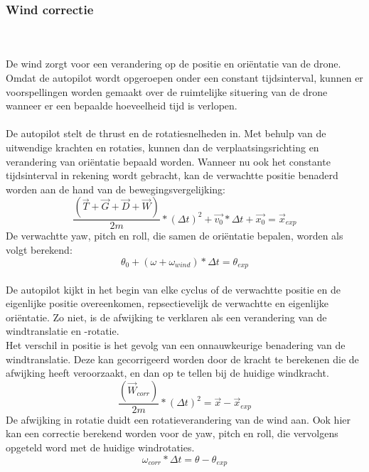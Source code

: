 \subsubsection{Wind correctie}
\\
\\
De wind zorgt voor een verandering op de positie en ori\"entatie van de drone. Omdat de autopilot wordt opgeroepen onder een constant tijdsinterval, kunnen er voorspellingen worden gemaakt over de ruimtelijke situering van de drone wanneer er een bepaalde hoeveelheid tijd is verlopen.
\\
\\
De autopilot stelt de thrust en de rotatiesnelheden in. Met behulp van de uitwendige krachten en rotaties, kunnen dan de verplaatsingsrichting en verandering van ori\"entatie bepaald worden. Wanneer nu ook het constante tijdsinterval in rekening wordt gebracht, kan de verwachtte positie benaderd worden aan de hand van de bewegingsvergelijking:
\begin{equation}
	 \frac{(\vec{T} + \vec{G} + \vec{D} + \vec{W}) }{2m} * (\Delta t)^2 + \vec{v_0} * \Delta t + \vec{x_0} = \vec{x}_{exp}
\end{equation}
De verwachtte yaw, pitch en roll, die samen de ori\"entatie bepalen, worden als volgt berekend:
\begin{equation}
	\theta_0 + (\omega + \omega_{wind})*\Delta t = \theta_{exp}
\end{equation}
\\
De autopilot kijkt in het begin van elke cyclus of de verwachtte positie en de eigenlijke positie overeenkomen, repsectievelijk de verwachtte en eigenlijke ori\"entatie. Zo niet, is de afwijking te verklaren als een verandering van de windtranslatie en -rotatie. 
\\
Het verschil in positie is het gevolg van een onnauwkeurige benadering van de windtranslatie. Deze kan gecorrigeerd worden door de kracht te berekenen die de afwijking heeft veroorzaakt, en dan op te tellen bij de huidige windkracht.
\begin{equation}
\frac{(\vec{W}_{corr}) }{2m} * (\Delta t)^2 = \vec{x}-\vec{x}_{exp}
\end{equation}
De afwijking in rotatie duidt een rotatieverandering van de wind aan. Ook hier kan een correctie berekend worden voor de yaw, pitch en roll, die vervolgens opgeteld word met de huidige windrotaties.
\begin{equation}
\omega_{corr}*\Delta t = \theta-\theta_{exp}
\end{equation}